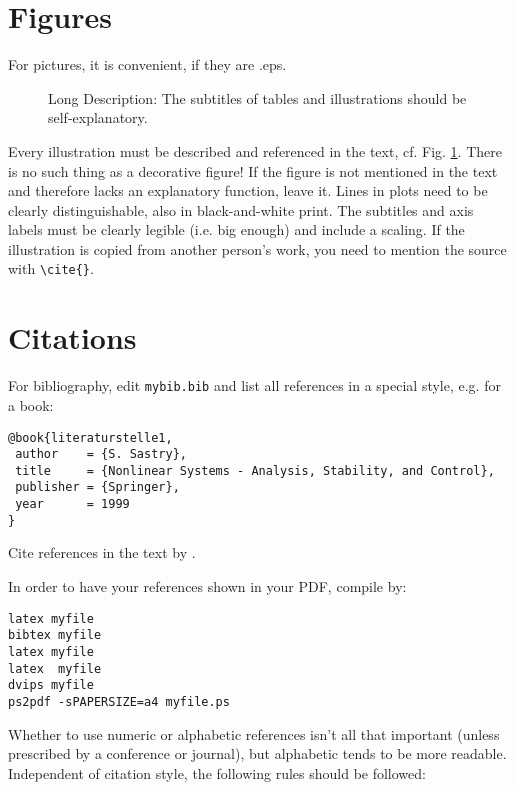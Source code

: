 \documentclass[a4paper,twoside, openright,12pt]{report}
\begin{document}
\section{Figures}

For pictures, it is convenient, if they are .eps.
\begin{figure}[htb]
\centering
\caption[Abbreviated Description]{Long Description: The subtitles of tables and illustrations should be self-explanatory.}
\label{FIG:abb1}
\end{figure}

Every illustration must be described and referenced in the text, cf. Fig. \ref{FIG:abb1}. 
There is no such thing as a decorative figure! 
If the figure is not mentioned in the text and therefore lacks an explanatory function, leave it.
Lines in plots need to be clearly distinguishable, also in black-and-white print. 
The subtitles and axis labels must be clearly legible (i.e. big enough) and include a scaling.
If the illustration is copied from another person's work, you need to mention the
source with \verb|\cite{}|.

\section{Citations}

For bibliography, edit {\tt mybib.bib} and list all
references in a special style, e.g. for a book: 
\begin{verbatim}
@book{literaturstelle1,
 author    = {S. Sastry},
 title     = {Nonlinear Systems - Analysis, Stability, and Control},
 publisher = {Springer},
 year      = 1999
}
\end{verbatim}

Cite references in the text by \cite{literaturstelle1}.

In order to have your references shown in your PDF, compile by:

\begin{verbatim} 
latex myfile
bibtex myfile
latex myfile
latex  myfile
dvips myfile
ps2pdf -sPAPERSIZE=a4 myfile.ps
\end{verbatim}

Whether to use numeric or alphabetic references isn't all that important (unless prescribed by a conference or journal), but alphabetic tends to be more readable. Independent of citation style, the following rules should be followed:
\end{document}
